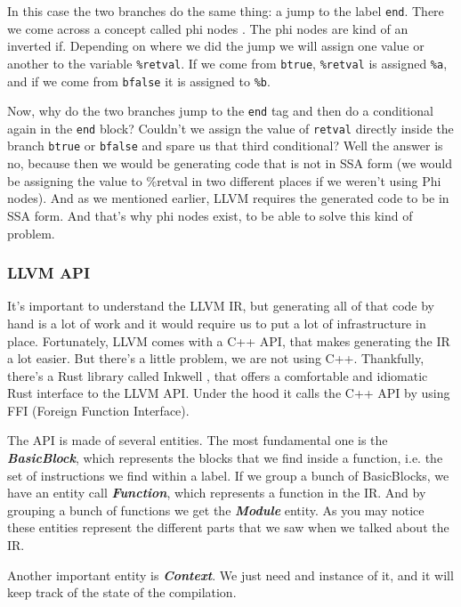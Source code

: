 ﻿\documentclass[10pt,a4paper,twocolumn,twoside]{article}
\begin{document}
In this case the two branches do the same thing: a jump to the label
\texttt{end}. There we come across a concept called phi nodes
\cite{phitutorial}\cite{phiinst}. The phi nodes are kind of an inverted if.
Depending on where we did the jump we will assign one value or another to the
variable \texttt{\%retval}. If we come from \texttt{btrue}, \texttt{\%retval} is
assigned \texttt{\%a}, and if we come from \texttt{bfalse} it is assigned to
\texttt{\%b}.

Now, why do the two branches jump to the \texttt{end} tag and then do a
conditional again in the \texttt{end} block? Couldn't we assign the value of
\texttt{retval} directly inside the branch \texttt{btrue} or \texttt{bfalse} and
spare us that third conditional? Well the answer is no, because then we would be
generating code that is not in SSA form (we would be assigning the value to
\%retval in two different places if we weren't using Phi nodes). And as we
mentioned earlier, LLVM requires the generated code to be in SSA form. And
that's why phi nodes exist, to be able to solve this kind of problem.

\subsubsection{LLVM API}

It's important to understand the LLVM IR, but generating all of that code by
hand is a lot of work and it would require us to put a lot of infrastructure in
place. Fortunately, LLVM comes with a C++ API, that makes generating the IR a
lot easier. But there's a little problem, we are not using C++. Thankfully,
there's a Rust library called Inkwell \cite{inkwell}, that offers a comfortable
and idiomatic Rust interface to the LLVM API. Under the hood it calls the C++
API by using FFI (Foreign Function Interface).

The API is made of several entities. The most fundamental one is the
\textbf{\textit{BasicBlock}}, which represents the blocks that we find inside a
function, i.e. the set of instructions we find within a label. If we group a
bunch of BasicBlocks, we have an entity call \textbf{\textit{Function}}, which
represents a function in the IR. And by grouping a bunch of functions we get the
\textbf{\textit{Module}} entity. As you may notice these entities represent the
different parts that we saw when we talked about the IR.

Another important entity is \textit{\textbf{Context}}. We just need and instance of it, 
and it will keep track of the state of the compilation.
\end{document}
